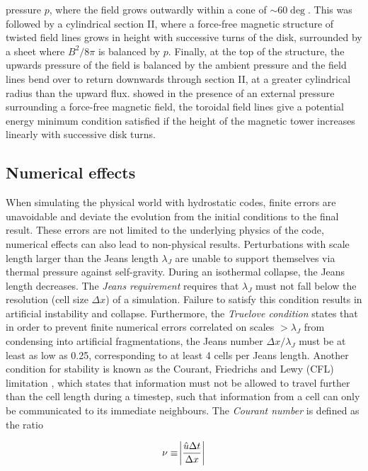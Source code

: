 \documentclass[11pt]{article}
\begin{document}
pressure $p$, where the field grows outwardly within a cone of $\sim 60\deg$. This was followed by a cylindrical section II, where a force-free magnetic structure of twisted field lines  grows in height with successive turns of the disk, surrounded by a sheet where $B^{2}/8\pi$  is balanced by $p$. Finally, at the top of the structure, the upwards pressure of the field is balanced by the ambient pressure and the field lines bend over to return downwards through section II, at a greater cylindrical radius than the upward flux. \cite{Lynden-Bell2003}  showed in the presence of an external pressure surrounding a force-free magnetic field, the toroidal field lines give a potential energy minimum condition satisfied if the height of the magnetic tower increases linearly with successive disk turns. 


\subsection{Numerical effects}
\label{sub:numerical}
When simulating the physical world with hydrostatic codes, finite errors are unavoidable and deviate the evolution from the initial conditions to the final result. These errors are not limited to the underlying physics of the code, numerical effects can also lead to non-physical results. Perturbations with scale length larger than the Jeans length $\lambda_{J}$ are unable to support themselves via thermal pressure against self-gravity. During an isothermal collapse, the Jeans length decreases. The \emph{Jeans requirement} requires that $\lambda_{J}$ must not fall below the resolution (cell size $\Delta x$) of a simulation. Failure to satisfy this condition results in artificial instability and collapse. Furthermore, the \emph{Truelove condition} \citep{Truelove1997} states that in order to prevent finite numerical errors correlated on scales $>\lambda_{J}$ from condensing into artificial fragmentations, the Jeans number $\Delta x/\lambda_{J}$ must be at least as low as 0.25, corresponding to at least 4 cells per Jeans length. Another condition for stability is known as the Courant, Friedrichs and Lewy (CFL) limitation \citep{Courant1952}, which states that information must not be allowed to travel further than the cell length during a timestep, such that information from a cell can only be communicated to its immediate neighbours. The \emph{Courant number} is defined as the ratio \citep[p.~70]{LeVeque2002}

\begin{equation}
\nu \equiv \abs{\frac{\hat{u}\Delta t}{ \Delta x} }
\end{equation}
\end{document}
